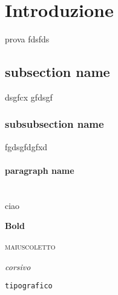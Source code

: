 \section{Introduzione}
prova fdsfds
\subsection{subsection name}
dsgfcx gfdsgf
\subsubsection{subsubsection name}
fgdsgfdgfxd
\paragraph{paragraph name} \mbox{} \\
ciao

\textbf{Bold}

\textsc{maiuscoletto}

\textit{corsivo}

\texttt{tipografico}
